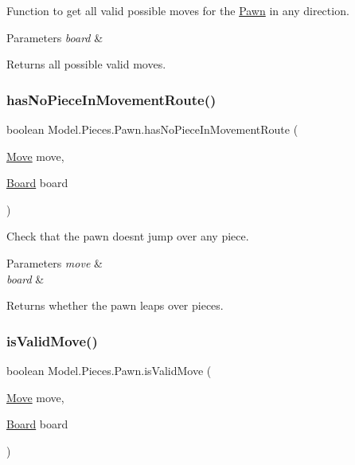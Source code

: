 Function to get all valid possible moves for the \hyperlink{class_model_1_1_pieces_1_1_pawn}{Pawn} in any direction. 
\begin{DoxyParams}{Parameters}
{\em board} & \\
\hline
\end{DoxyParams}
\begin{DoxyReturn}{Returns}
all possible valid moves. 
\end{DoxyReturn}
\hypertarget{class_model_1_1_pieces_1_1_pawn_a051caa0213913b8c3748f47a5bdfcab6}{}\label{class_model_1_1_pieces_1_1_pawn_a051caa0213913b8c3748f47a5bdfcab6} 
\subsubsection{\texorpdfstring{has\+No\+Piece\+In\+Movement\+Route()}{hasNoPieceInMovementRoute()}}
{\footnotesize\ttfamily boolean Model.\+Pieces.\+Pawn.\+has\+No\+Piece\+In\+Movement\+Route (\begin{DoxyParamCaption}\item[{\hyperlink{class_model_1_1_move}{Move}}]{move,  }\item[{\hyperlink{class_model_1_1_board}{Board}}]{board }\end{DoxyParamCaption})}

Check that the pawn doesn\textquotesingle{}t jump over any piece. 
\begin{DoxyParams}{Parameters}
{\em move} & \\
\hline
{\em board} & \\
\hline
\end{DoxyParams}
\begin{DoxyReturn}{Returns}
whether the pawn leaps over pieces. 
\end{DoxyReturn}
\hypertarget{class_model_1_1_pieces_1_1_pawn_a8bb2d90244e6992f8c24108d2a8c13e7}{}\label{class_model_1_1_pieces_1_1_pawn_a8bb2d90244e6992f8c24108d2a8c13e7} 
\subsubsection{\texorpdfstring{is\+Valid\+Move()}{isValidMove()}}
{\footnotesize\ttfamily boolean Model.\+Pieces.\+Pawn.\+is\+Valid\+Move (\begin{DoxyParamCaption}\item[{\hyperlink{class_model_1_1_move}{Move}}]{move,  }\item[{\hyperlink{class_model_1_1_board}{Board}}]{board }\end{DoxyParamCaption})}

